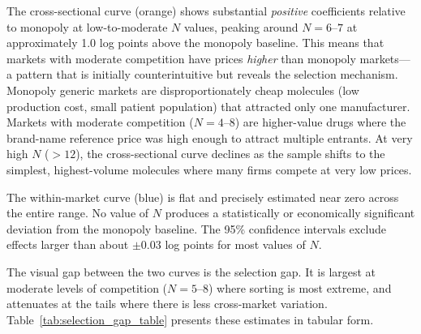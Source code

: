 \documentclass[12pt]{article}
\begin{document}
The cross-sectional curve (orange) shows substantial \emph{positive} coefficients relative to monopoly at low-to-moderate $N$ values, peaking around $N = 6$--$7$ at approximately 1.0 log points above the monopoly baseline. This means that markets with moderate competition have prices \emph{higher} than monopoly markets---a pattern that is initially counterintuitive but reveals the selection mechanism. Monopoly generic markets are disproportionately cheap molecules (low production cost, small patient population) that attracted only one manufacturer. Markets with moderate competition ($N = 4$--$8$) are higher-value drugs where the brand-name reference price was high enough to attract multiple entrants. At very high $N$ ($>12$), the cross-sectional curve declines as the sample shifts to the simplest, highest-volume molecules where many firms compete at very low prices.

The within-market curve (blue) is flat and precisely estimated near zero across the entire range. No value of $N$ produces a statistically or economically significant deviation from the monopoly baseline. The 95\% confidence intervals exclude effects larger than about $\pm 0.03$ log points for most values of $N$.

The visual gap between the two curves is the selection gap. It is largest at moderate levels of competition ($N = 5$--$8$) where sorting is most extreme, and attenuates at the tails where there is less cross-market variation. Table~\ref{tab:selection_gap_table} presents these estimates in tabular form.
\end{document}
